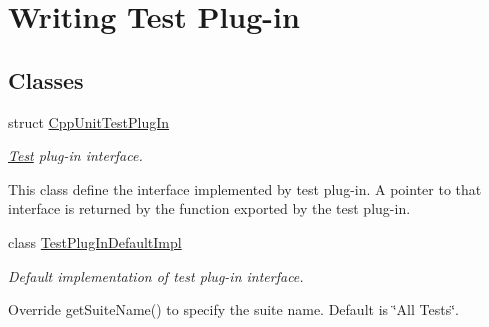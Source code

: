 \hypertarget{group___writing_test_plug_in}{\section{Writing Test Plug-\/in}
\label{group___writing_test_plug_in}
}
\subsection*{Classes}
\begin{DoxyCompactItemize}
\item 
struct \hyperlink{struct_cpp_unit_test_plug_in}{Cpp\+Unit\+Test\+Plug\+In}
\begin{DoxyCompactList}\small\item\em \hyperlink{class_test}{Test} plug-\/in interface.

This class define the interface implemented by test plug-\/in. A pointer to that interface is returned by the function exported by the test plug-\/in. \end{DoxyCompactList}\item 
class \hyperlink{class_test_plug_in_default_impl}{Test\+Plug\+In\+Default\+Impl}
\begin{DoxyCompactList}\small\item\em Default implementation of test plug-\/in interface.

Override get\+Suite\+Name() to specify the suite name. Default is \char`\"{}\+All Tests\char`\"{}. \end{DoxyCompactList}\end{DoxyCompactItemize}
